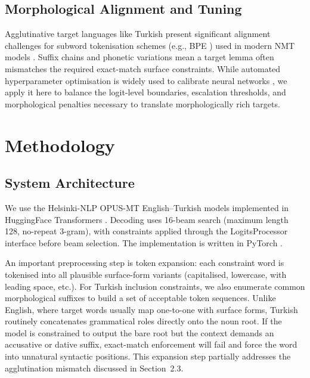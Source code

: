 \documentclass{CUP-JNL-NLP}
\begin{document}
\subsection{Morphological Alignment and Tuning}

Agglutinative target languages like Turkish present significant alignment challenges
for subword tokenisation schemes (e.g., BPE \citep{sennrich2016bpe}) used in modern
NMT models \citep{tiedemann2020opus}. Suffix chains and phonetic variations mean a
target lemma often mismatches the required exact-match surface constraints. While
automated hyperparameter optimisation is widely used to calibrate neural networks
\citep{akiba2019optuna}, we apply it here to balance the logit-level boundaries,
escalation thresholds, and morphological penalties necessary to translate
morphologically rich targets.

\section{Methodology}

\subsection{System Architecture}

We use the Helsinki-NLP OPUS-MT English--Turkish models
\citep{tiedemann2020opus,tiedemann2023democratizing} implemented in HuggingFace
Transformers \citep{wolf2020transformers}. Decoding uses 16-beam search
\citep{freitag2017beam} (maximum length 128, no-repeat 3-gram), with constraints
applied through the LogitsProcessor interface before beam selection. The
implementation is written in PyTorch \citep{paszke2019pytorch}.

An important preprocessing step is token expansion: each constraint word is
tokenised into all plausible surface-form variants (capitalised, lowercase, with
leading space, etc.). For Turkish inclusion constraints, we also enumerate common
morphological suffixes to build a set of acceptable token sequences. Unlike English,
where target words usually map one-to-one with surface forms, Turkish routinely
concatenates grammatical roles directly onto the noun root. If the model is
constrained to output the bare root but the context demands an accusative or dative
suffix, exact-match enforcement will fail and force the word into unnatural syntactic
positions. This expansion step partially addresses the agglutination mismatch
discussed in Section~2.3.
\end{document}
